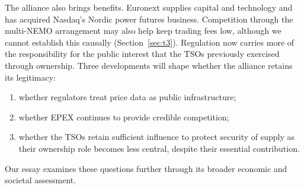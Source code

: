 The alliance also brings benefits. Euronext supplies capital and technology and has acquired Nasdaq's Nordic power futures business. Competition through the multi-NEMO arrangement may also help keep trading fees low, although we cannot establish this causally (Section~\ref{sec:t3}). Regulation now carries more of the responsibility for the public interest that the TSOs previously exercised through ownership. Three developments will shape whether the alliance retains its legitimacy:
\begin{enumerate}
  \item whether regulators treat price data as public infrastructure;
  \item whether EPEX continues to provide credible competition;
  \item whether the TSOs retain sufficient influence to protect security of supply as their ownership role becomes less central, despite their essential contribution.
\end{enumerate}
Our essay examines these questions further through its broader economic and societal assessment.
